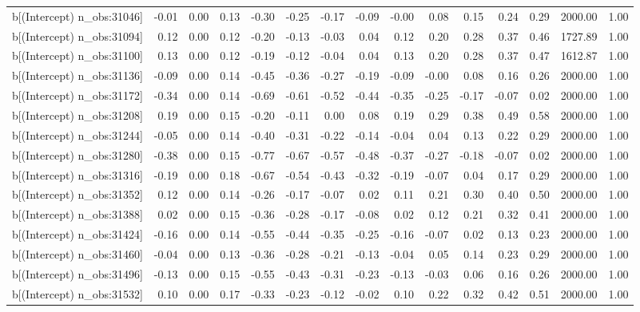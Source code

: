 \begin{table}[ht]
\begin{tabular}{rrrrrrrrrrrrrrr}
  b[(Intercept) n\_obs:31046] & -0.01 & 0.00 & 0.13 & -0.30 & -0.25 & -0.17 & -0.09 & -0.00 & 0.08 & 0.15 & 0.24 & 0.29 & 2000.00 & 1.00 \\ 
  b[(Intercept) n\_obs:31094] & 0.12 & 0.00 & 0.12 & -0.20 & -0.13 & -0.03 & 0.04 & 0.12 & 0.20 & 0.28 & 0.37 & 0.46 & 1727.89 & 1.00 \\ 
  b[(Intercept) n\_obs:31100] & 0.13 & 0.00 & 0.12 & -0.19 & -0.12 & -0.04 & 0.04 & 0.13 & 0.20 & 0.28 & 0.37 & 0.47 & 1612.87 & 1.00 \\ 
  b[(Intercept) n\_obs:31136] & -0.09 & 0.00 & 0.14 & -0.45 & -0.36 & -0.27 & -0.19 & -0.09 & -0.00 & 0.08 & 0.16 & 0.26 & 2000.00 & 1.00 \\ 
  b[(Intercept) n\_obs:31172] & -0.34 & 0.00 & 0.14 & -0.69 & -0.61 & -0.52 & -0.44 & -0.35 & -0.25 & -0.17 & -0.07 & 0.02 & 2000.00 & 1.00 \\ 
  b[(Intercept) n\_obs:31208] & 0.19 & 0.00 & 0.15 & -0.20 & -0.11 & 0.00 & 0.08 & 0.19 & 0.29 & 0.38 & 0.49 & 0.58 & 2000.00 & 1.00 \\ 
  b[(Intercept) n\_obs:31244] & -0.05 & 0.00 & 0.14 & -0.40 & -0.31 & -0.22 & -0.14 & -0.04 & 0.04 & 0.13 & 0.22 & 0.29 & 2000.00 & 1.00 \\ 
  b[(Intercept) n\_obs:31280] & -0.38 & 0.00 & 0.15 & -0.77 & -0.67 & -0.57 & -0.48 & -0.37 & -0.27 & -0.18 & -0.07 & 0.02 & 2000.00 & 1.00 \\ 
  b[(Intercept) n\_obs:31316] & -0.19 & 0.00 & 0.18 & -0.67 & -0.54 & -0.43 & -0.32 & -0.19 & -0.07 & 0.04 & 0.17 & 0.29 & 2000.00 & 1.00 \\ 
  b[(Intercept) n\_obs:31352] & 0.12 & 0.00 & 0.14 & -0.26 & -0.17 & -0.07 & 0.02 & 0.11 & 0.21 & 0.30 & 0.40 & 0.50 & 2000.00 & 1.00 \\ 
  b[(Intercept) n\_obs:31388] & 0.02 & 0.00 & 0.15 & -0.36 & -0.28 & -0.17 & -0.08 & 0.02 & 0.12 & 0.21 & 0.32 & 0.41 & 2000.00 & 1.00 \\ 
  b[(Intercept) n\_obs:31424] & -0.16 & 0.00 & 0.14 & -0.55 & -0.44 & -0.35 & -0.25 & -0.16 & -0.07 & 0.02 & 0.13 & 0.23 & 2000.00 & 1.00 \\ 
  b[(Intercept) n\_obs:31460] & -0.04 & 0.00 & 0.13 & -0.36 & -0.28 & -0.21 & -0.13 & -0.04 & 0.05 & 0.14 & 0.23 & 0.29 & 2000.00 & 1.00 \\ 
  b[(Intercept) n\_obs:31496] & -0.13 & 0.00 & 0.15 & -0.55 & -0.43 & -0.31 & -0.23 & -0.13 & -0.03 & 0.06 & 0.16 & 0.26 & 2000.00 & 1.00 \\ 
  b[(Intercept) n\_obs:31532] & 0.10 & 0.00 & 0.17 & -0.33 & -0.23 & -0.12 & -0.02 & 0.10 & 0.22 & 0.32 & 0.42 & 0.51 & 2000.00 & 1.00 \\ 

\end{tabular}
\end{table}
